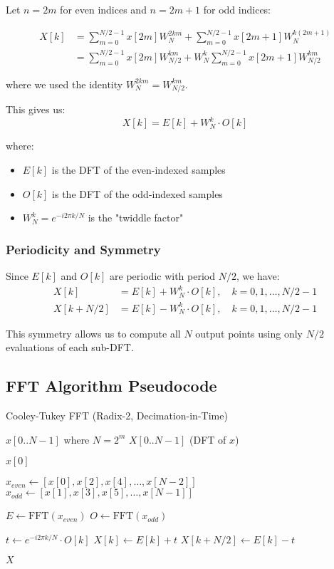 \documentclass[11pt,a4paper]{article}
\begin{document}
Let $n = 2m$ for even indices and $n = 2m+1$ for odd indices:

\begin{align}
X[k] &= \sum_{m=0}^{N/2-1} x[2m] W_N^{2km} + \sum_{m=0}^{N/2-1} x[2m+1] W_N^{k(2m+1)} \\
&= \sum_{m=0}^{N/2-1} x[2m] W_{N/2}^{km} + W_N^k \sum_{m=0}^{N/2-1} x[2m+1] W_{N/2}^{km}
\end{align}

where we used the identity $W_N^{2km} = W_{N/2}^{km}$.

This gives us:
\begin{equation}
X[k] = E[k] + W_N^k \cdot O[k]
\end{equation}

where:
\begin{itemize}
    \item $E[k]$ is the DFT of the even-indexed samples
    \item $O[k]$ is the DFT of the odd-indexed samples
    \item $W_N^k = e^{-i2\pi k/N}$ is the "twiddle factor"
\end{itemize}

\subsubsection{Periodicity and Symmetry}

Since $E[k]$ and $O[k]$ are periodic with period $N/2$, we have:
\begin{align}
X[k] &= E[k] + W_N^k \cdot O[k], \quad k = 0, 1, \ldots, N/2-1 \\
X[k + N/2] &= E[k] - W_N^k \cdot O[k], \quad k = 0, 1, \ldots, N/2-1
\end{align}

This symmetry allows us to compute all $N$ output points using only $N/2$ evaluations of each sub-DFT.

\subsection{FFT Algorithm Pseudocode}

\begin{algorithm}
\caption{Cooley-Tukey FFT (Radix-2, Decimation-in-Time)}
\begin{algorithmic}[1]
\REQUIRE $x[0..N-1]$ where $N = 2^m$
\ENSURE $X[0..N-1]$ (DFT of $x$)

    \RETURN $x[0]$
\ENDIF

\STATE $x_{even} \leftarrow [x[0], x[2], x[4], \ldots, x[N-2]]$
\STATE $x_{odd} \leftarrow [x[1], x[3], x[5], \ldots, x[N-1]]$

\STATE $E \leftarrow \text{FFT}(x_{even})$ 
\STATE $O \leftarrow \text{FFT}(x_{odd})$ 

    \STATE $t \leftarrow e^{-i2\pi k/N} \cdot O[k]$ 
    \STATE $X[k] \leftarrow E[k] + t$
    \STATE $X[k + N/2] \leftarrow E[k] - t$
\ENDFOR

\RETURN $X$
\end{algorithmic}
\end{algorithm}
\end{document}

